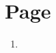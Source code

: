 \documentclass[12pt]{report}
\begin{document}
\section{Page}
\begin{enumerate}
\setlength\itemsep{1em}
    \item{}
\end{enumerate}
\end{document}
